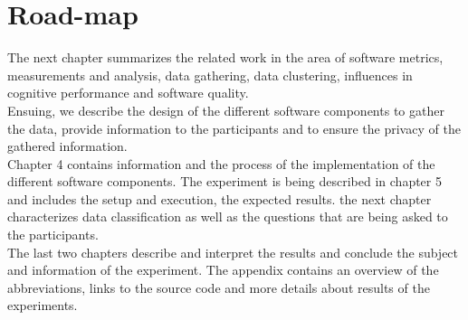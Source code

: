 \section{Road-map}
The next chapter summarizes the related work in the area of software metrics, measurements and analysis, data gathering, data clustering, influences in cognitive performance and software quality.\\
Ensuing, we describe the design of the different software components to gather the data, provide information to the participants and to ensure the privacy of the gathered information.\\
Chapter 4 contains information and the process of the implementation of the different software components. 
The experiment is being described in chapter 5 and includes the setup and execution, the expected results. the next chapter characterizes data classification as well as the questions that are being asked to the participants. \\
The last two chapters describe and interpret the results and conclude the subject and information of the experiment.
The appendix contains an overview of the abbreviations, links to the source code and more details about results of the experiments.

